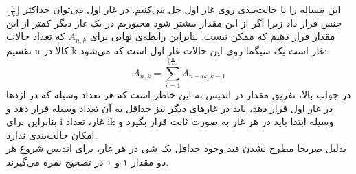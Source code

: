 \p
    این مساله را با حالت‌بندی روی غار اول حل می‌کنیم. در غار اول می‌توان حداکثر \( \lfloor \frac{n}{k} \rfloor \) جنس قرار داد زیرا اگر از این مقدار بیشتر شود مجبوریم در یک غار دیگر کمتر از این مقدار قرار دهیم که ممکن نیست. بنابراین رابطه‌ی نهایی برای \( A_{n,k} \) که تعداد حالات تقسیم n کالا در k غار است یک سیگما روی این حالات غار اول است که می‌شود:
\[ A_{n,k} = \sum\limits_{i=1}^{\lfloor \frac{n}{k} \rfloor}  A_{n-ik,k-1} \]در جواب بالا، تفریق مقدار  در اندیس به این خاطر است که هر تعداد وسیله که در اژدها در غار اول قرار دهد، باید در غارهای دیگر نیز حداقل به آن تعداد وسیله قرار دهد و بنابراین برای i غار، تعداد ik وسیله ابتدا باید در هر غار به صورت ثابت قرار بگیرد و امکان حالت‌بندی ندارد. \\ بدلیل صریحا مطرح نشدن قید وجود حداقل یک شی در هر غار، برای اندیس شروع هر دو مقدار ۱ و ۰ در تصحیح نمره می‌گیرند.
